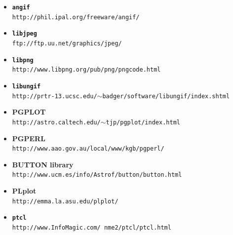 \documentclass[twoside,11pt]{article}
\newcommand{\htmladdnormallink}[2]{#1}
\begin{document}
\begin{itemize}
\item {\bf\label{sc15_available_libangif}{\tt angif}}\\
\htmladdnormallink{{\tt http://phil.ipal.org/freeware/angif/}}{http://phil.ipal.org/freeware/angif/}

\item {\bf\label{sc15_available_libjpeg}{\tt libjpeg}}\\
\htmladdnormallink{{\tt ftp://ftp.uu.net/graphics/jpeg/}}{ftp://ftp.uu.net/graphics/jpeg/}

\item {\bf\label{sc15_available_libpng}{\tt libpng}}\\
\htmladdnormallink{{\tt http://www.libpng.org/pub/png/pngcode.html}}{http://www.libpng.org/pub/png/pngcode.html}

 \item {\bf\label{sc15_available_libungif}{\tt libungif}}\\
\htmladdnormallink{{\tt http://prtr-13.ucsc.edu/$\sim$badger/software/libungif/index.shtml}}{http://prtr-13.ucsc.edu/~badger/software/libungif/index.shtml}

\item {\bf\label{sc15_available_pgplot}PGPLOT}\\
\htmladdnormallink{{\tt http://astro.caltech.edu/$\sim$tjp/pgplot/index.html}}{http://astro.caltech.edu/~tjp/pgplot/index.html}

\item {\bf\label{sc15_available_pgperl}PGPERL}\\
\htmladdnormallink{{\tt http://www.aao.gov.au/local/www/kgb/pgperl/}}{http://www.aao.gov.au/local/www/kgb/pgperl/}

\item {\bf\label{sc15_available_button}BUTTON library}\\
\htmladdnormallink{{\tt http://www.ucm.es/info/Astrof/button/button.html}}{http://www.ucm.es/info/Astrof/button/button.html}

\item {\bf\label{sc15_available_plplot}PLplot}\\
\htmladdnormallink{{\tt http://emma.la.asu.edu/plplot/}}{http://emma.la.asu.edu/plplot/}

\item {\bf\label{sc15_available_ptcl}{\tt ptcl}}\\
\htmladdnormallink{{\tt http://www.InfoMagic.com/~nme2/ptcl/ptcl.html}}{http://www.InfoMagic.com/~nme2/ptcl/ptcl.html}


\end{itemize}
\end{document}
